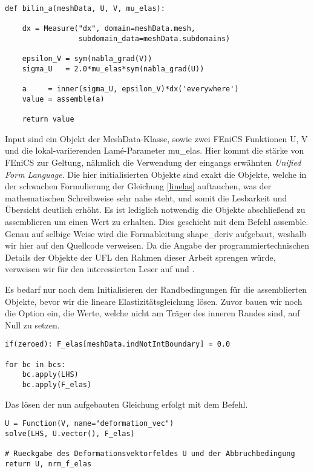 \begin{lstlisting}
def bilin_a(meshData, U, V, mu_elas):

    dx = Measure("dx", domain=meshData.mesh, 
                 subdomain_data=meshData.subdomains)

    epsilon_V = sym(nabla_grad(V))
    sigma_U   = 2.0*mu_elas*sym(nabla_grad(U))

    a     = inner(sigma_U, epsilon_V)*dx('everywhere')
    value = assemble(a)

    return value

\end{lstlisting}
Input sind ein Objekt der \textsf{MeshData}-Klasse, sowie zwei FEniCS Funktionen \textsf{U, V} und die lokal-variierenden Lamé-Parameter \textsf{mu\_elas}. Hier kommt die stärke von FEniCS zur Geltung, nähmlich die Verwendung der eingangs erwähnten \textit{Unified Form Language}. Die hier initialisierten Objekte sind exakt die Objekte, welche in der schwachen Formulierung der Gleichung \ref{linelas}  auftauchen, was der mathematischen Schreibweise sehr nahe steht, und somit die Lesbarkeit und Übersicht deutlich erhöht. Es ist lediglich notwendig die Objekte abschließend zu assemblieren um einen Wert zu erhalten. Dies geschieht mit dem Befehl \textsf{assemble}. Genau auf selbige Weise wird die Formableitung \textsf{shape\_deriv} aufgebaut, weshalb wir hier auf den Quellcode verweisen. Da die Angabe der programmiertechnischen Details der Objekte der UFL den Rahmen dieser Arbeit sprengen würde, verweisen wir für den interessierten Leser auf \cite{fenics} und \cite{Unifiedformlanguage}.

Es bedarf nur noch dem Initialisieren der Randbedingungen für die assemblierten Objekte, bevor wir die lineare Elastizitätsgleichung lösen. Zuvor bauen wir noch die Option ein, die Werte, welche nicht am Träger des inneren Randes sind, auf Null zu setzen.

\begin{lstlisting}
if(zeroed): F_elas[meshData.indNotIntBoundary] = 0.0

for bc in bcs:
    bc.apply(LHS)
    bc.apply(F_elas)
\end{lstlisting}

Das lösen der nun aufgebauten Gleichung erfolgt mit dem Befehl.
\begin{lstlisting}
U = Function(V, name="deformation_vec")
solve(LHS, U.vector(), F_elas)

# Rueckgabe des Deformationsvektorfeldes U und der Abbruchbedingung
return U, nrm_f_elas

\end{lstlisting}

